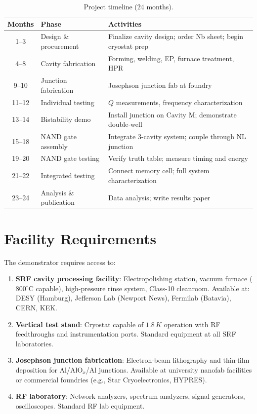 \documentclass[12pt,a4paper]{article}
\begin{document}
\begin{table}[H]
\centering
\caption{Project timeline (24 months).}
\begin{tabular}{clp{8cm}}
\toprule
\textbf{Months} & \textbf{Phase} & \textbf{Activities} \\
\midrule
1--3 & Design \& procurement & Finalize cavity design; order Nb sheet; begin cryostat prep \\
4--8 & Cavity fabrication & Forming, welding, EP, furnace treatment, HPR \\
9--10 & Junction fabrication & Josephson junction fab at foundry \\
11--12 & Individual testing & $Q$ measurements, frequency characterization \\
13--14 & Bistability demo & Install junction on Cavity M; demonstrate double-well \\
15--18 & NAND gate assembly & Integrate 3-cavity system; couple through NL junction \\
19--20 & NAND gate testing & Verify truth table; measure timing and energy \\
21--22 & Integrated testing & Connect memory cell; full system characterization \\
23--24 & Analysis \& publication & Data analysis; write results paper \\
\bottomrule
\end{tabular}
\end{table}

\section{Facility Requirements}

The demonstrator requires access to:

\begin{enumerate}
\item \textbf{SRF cavity processing facility}: Electropolishing station, vacuum furnace ($800^\circ$C capable), high-pressure rinse system, Class-10 cleanroom. Available at: DESY (Hamburg), Jefferson Lab (Newport News), Fermilab (Batavia), CERN, KEK.

\item \textbf{Vertical test stand}: Cryostat capable of $1.8\,\si{K}$ operation with RF feedthroughs and instrumentation ports. Standard equipment at all SRF laboratories.

\item \textbf{Josephson junction fabrication}: Electron-beam lithography and thin-film deposition for Al/AlO$_x$/Al junctions. Available at university nanofab facilities or commercial foundries (e.g., Star Cryoelectronics, HYPRES).

\item \textbf{RF laboratory}: Network analyzers, spectrum analyzers, signal generators, oscilloscopes. Standard RF lab equipment.
\end{enumerate}
\end{document}
